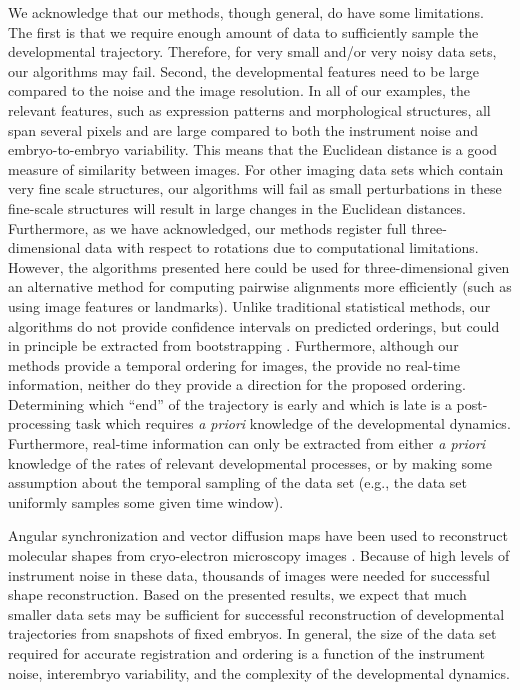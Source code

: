 \documentclass[twocolumn, 10pt]{article}
\begin{document}
We acknowledge that our methods, though general, do have some limitations. 
%
The first is that we require enough amount of data to sufficiently sample the developmental trajectory.
%
Therefore, for very small and/or very noisy data sets, our algorithms may fail. 
%
Second, the developmental features need to be large compared to the noise and the image resolution. 
%
In all of our examples, the relevant features, such as expression patterns and morphological structures, all span several pixels and are large compared to both the instrument noise and embryo-to-embryo variability. 
%
This means that the Euclidean distance is a good measure of similarity between images.
%
For other imaging data sets which contain very fine scale structures, our algorithms will fail as small perturbations in these fine-scale structures will result in large changes in the Euclidean distances. 
%
Furthermore, as we have acknowledged, our methods register full three-dimensional data with respect to rotations due to computational limitations. 
%
However, the algorithms presented here could be used for three-dimensional given an alternative method for computing pairwise alignments more efficiently (such as using image features or landmarks).
%
Unlike traditional statistical methods, our algorithms do not provide confidence intervals on predicted orderings, but could in principle be extracted from bootstrapping \citep{efron1979bootstrap}.
%
Furthermore, although our methods provide a temporal ordering for images, the provide no real-time information, neither do they provide a direction for the proposed ordering.
%
Determining which ``end'' of the trajectory is early and which is late is a post-processing task which requires {\em a priori} knowledge of the developmental dynamics. 
%
Furthermore, real-time information can only be extracted from either {\em a priori} knowledge of the rates of relevant developmental processes, or by making some assumption about the temporal sampling of the data set (e.g., the data set uniformly samples some given time window). 

Angular synchronization and vector diffusion maps have been used to reconstruct molecular shapes from cryo-electron microscopy images \citep{singer2012vector, zhao2014rotationally, singer2011viewing}.
%
Because of high levels of instrument noise in these data, thousands of images were needed for successful shape reconstruction. 
%
Based on the presented results, we expect that much smaller data sets may be sufficient for successful reconstruction of developmental trajectories from snapshots of fixed embryos.
%
In general, the size of the data set required for accurate registration and ordering is a function of the instrument noise, interembryo variability, and the complexity of the developmental dynamics.
%
\end{document}
